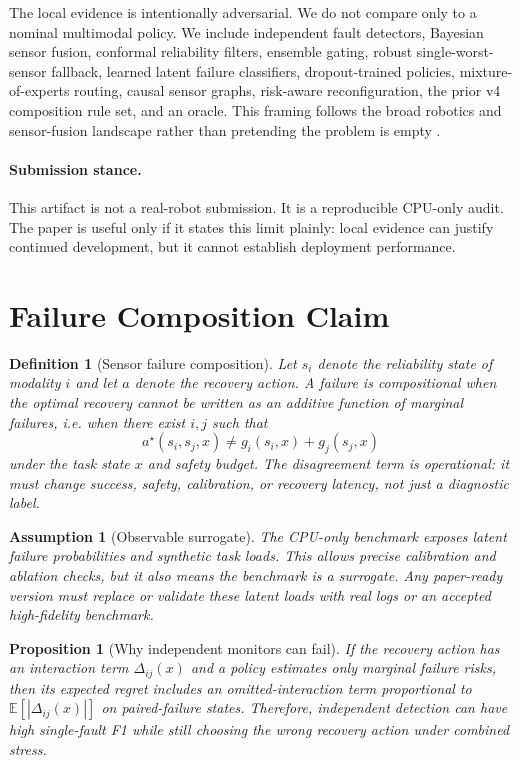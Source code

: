 \documentclass{article}
\newtheorem{definition}{Definition}
\newtheorem{proposition}{Proposition}
\newtheorem{assumption}{Assumption}
\begin{document}
The local evidence is intentionally adversarial. We do not compare only to a nominal multimodal policy. We include independent fault detectors, Bayesian sensor fusion, conformal reliability filters, ensemble gating, robust single-worst-sensor fallback, learned latent failure classifiers, dropout-trained policies, mixture-of-experts routing, causal sensor graphs, risk-aware reconfiguration, the prior v4 composition rule set, and an oracle. This framing follows the broad robotics and sensor-fusion landscape rather than pretending the problem is empty \citep{narkhede2021gas1,loo2022robust2,khanna2025reflex3,betancourt2023robust4,zhao2025polytouch5,fan2025magicgripper6,patel2019a7,inceoglu2023multimodal8}.

\paragraph{Submission stance.}
This artifact is not a real-robot submission. It is a reproducible CPU-only audit. The paper is useful only if it states this limit plainly: local evidence can justify continued development, but it cannot establish deployment performance.

\section{Failure Composition Claim}
\begin{definition}[Sensor failure composition]
Let $s_i$ denote the reliability state of modality $i$ and let $a$ denote the recovery action. A failure is compositional when the optimal recovery cannot be written as an additive function of marginal failures, i.e. when there exist $i,j$ such that
\[
  a^\star(s_i,s_j,x) \neq g_i(s_i,x) + g_j(s_j,x)
\]
under the task state $x$ and safety budget. The disagreement term is operational: it must change success, safety, calibration, or recovery latency, not just a diagnostic label.
\end{definition}

\begin{assumption}[Observable surrogate]
The CPU-only benchmark exposes latent failure probabilities and synthetic task loads. This allows precise calibration and ablation checks, but it also means the benchmark is a surrogate. Any paper-ready version must replace or validate these latent loads with real logs or an accepted high-fidelity benchmark.
\end{assumption}

\begin{proposition}[Why independent monitors can fail]
If the recovery action has an interaction term $\Delta_{ij}(x)$ and a policy estimates only marginal failure risks, then its expected regret includes an omitted-interaction term proportional to $\mathbb{E}[|\Delta_{ij}(x)|]$ on paired-failure states. Therefore, independent detection can have high single-fault F1 while still choosing the wrong recovery action under combined stress.
\end{proposition}
\end{document}
